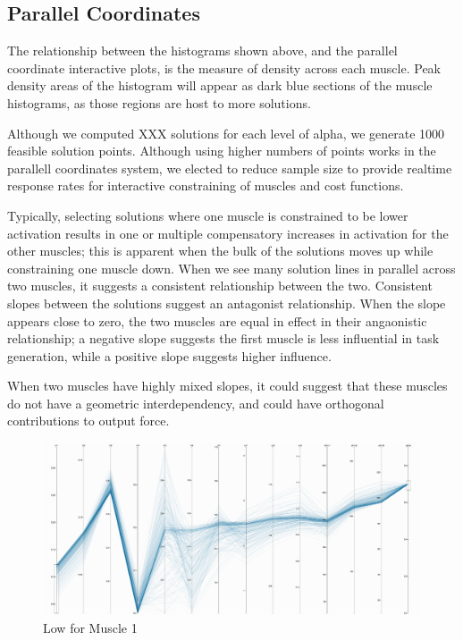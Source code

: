 \subsection{Parallel Coordinates}
The relationship between the histograms shown above, and the parallel coordinate interactive plots, is the measure of density across each muscle. Peak density areas of the histogram will appear as dark blue sections of the muscle histograms, as those regions are host to more solutions.

Although we computed XXX solutions for each level of alpha, we generate 1000 feasible solution points. Although using higher numbers of points works in the parallell coordinates system, we elected to reduce sample size to provide realtime response rates for interactive constraining of muscles and cost functions.


Typically, selecting solutions where one muscle is constrained to be lower activation results in one or multiple compensatory increases in activation for the other muscles; this is apparent when the bulk of the solutions moves up while constraining one muscle down. When we see many solution lines in parallel across two muscles, it suggests a consistent relationship between the two. Consistent slopes between the solutions suggest an antagonist relationship. When the slope appears close to zero, the two muscles are equal in effect in their angaonistic relationship; a negative slope suggests the first muscle is less influential in task generation, while a positive slope suggests higher influence.

When two muscles have highly mixed slopes, it could suggest that these muscles do not have a geometric interdependency, and could have orthogonal contributions to output force. 

\begin{figure}[ht]
   \begin{center}
    \includegraphics[width=1.0\textwidth]{figs/X_a8_lower.png}
  \end{center}
  \caption{Low for Muscle 1}
  \label{fig_low}
\end{figure}


